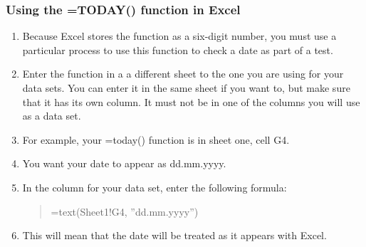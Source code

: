 \subsubsection{Using the =TODAY() function in Excel}
\label{exceltoday}
\begin{enumerate}
\item Because Excel stores the  function as a six-digit number, you must use a particular process to use this function to check a date as part of a test.
\item Enter the function  in a a different sheet to the one you are using for your data sets. You can enter it in the same sheet if you want to, but make sure that it has its own column. It must not be in one of the columns you will use as a data set.
\item For example, your =today() function is in sheet one, cell G4.
\item You want your date to appear as dd.mm.yyyy.
\item In the column for your data set, enter the following formula:
\begin{quote}
=text(Sheet1!G4, ''dd.mm.yyyy'')
\end{quote}
\item This will mean that the date will be treated as it appears with Excel. 
\end{enumerate}

